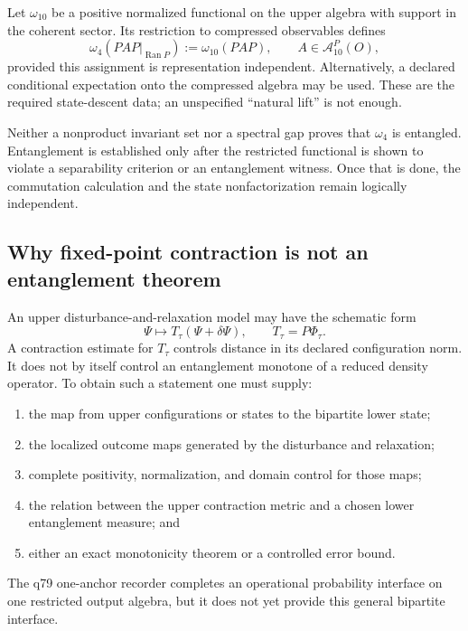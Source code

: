 \documentclass[11pt]{article}
\begin{document}
Let $\omega_{10}$ be a positive normalized functional on the upper algebra
with support in the coherent sector.  Its restriction to compressed
observables defines
\[
 \omega_4(PAP|_{\operatorname{Ran}P})
 :=\omega_{10}(PAP),
 \qquad A\in\mathcal A_{10}^{P}(O),
\]
provided this assignment is representation independent.  Alternatively, a
declared conditional expectation onto the compressed algebra may be used.
These are the required state-descent data; an unspecified ``natural lift'' is
not enough.

Neither a nonproduct invariant set nor a spectral gap proves that
$\omega_4$ is entangled.  Entanglement is established only after the
restricted functional is shown to violate a separability criterion or an
entanglement witness.  Once that is done, the commutation calculation and the
state nonfactorization remain logically independent.

\subsection{Why fixed-point contraction is not an entanglement theorem}

An upper disturbance-and-relaxation model may have the schematic form
\begin{equation}\label{eq:FP-measure}
 \Psi\longmapsto T_\tau(\Psi+\delta\Psi),
 \qquad T_\tau=P\Phi_\tau.
\end{equation}
A contraction estimate for $T_\tau$ controls distance in its declared
configuration norm.  It does not by itself control an entanglement monotone
of a reduced density operator.  To obtain such a statement one must supply:
\begin{enumerate}
\item the map from upper configurations or states to the bipartite lower
      state;
\item the localized outcome maps generated by the disturbance and relaxation;
\item complete positivity, normalization, and domain control for those maps;
\item the relation between the upper contraction metric and a chosen lower
      entanglement measure; and
\item either an exact monotonicity theorem or a controlled error bound.
\end{enumerate}
The q79 one-anchor recorder completes an operational probability interface on
one restricted output algebra, but it does not yet provide this general
bipartite interface.
\end{document}
